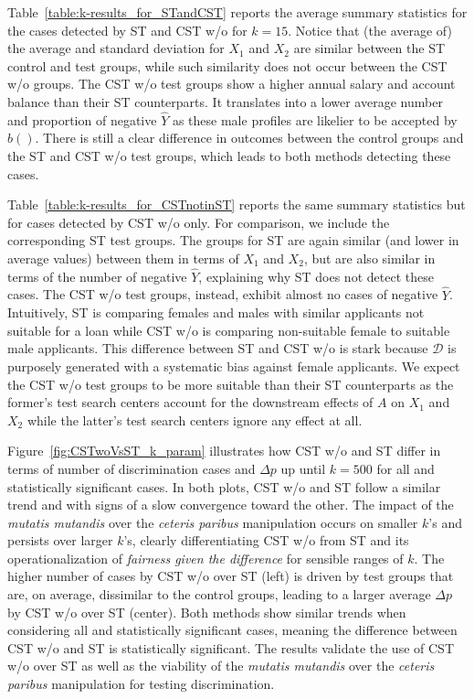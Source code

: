 Table~\ref{table:k-results_for_STandCST} reports the average summary statistics for the cases detected by ST and CST w/o for $k=15$.
Notice that (the average of) the average and standard deviation for $X_1$ and $X_2$ are similar between the ST control and test groups, while such similarity does not occur between the CST w/o groups.
The CST w/o test groups show a higher annual salary and account balance than their ST counterparts. 
It translates into a lower average number and proportion of negative $\hat{Y}$ as these male profiles are likelier to be accepted by $b()$.
There is still a clear difference in outcomes between the control groups and the ST and CST w/o test groups, which leads to both methods detecting these cases.

Table~\ref{table:k-results_for_CSTnotinST} reports the same summary statistics but for cases detected by CST w/o only. 
For comparison, we include the corresponding ST test groups. 
The groups for ST are again similar (and lower in average values) between them in terms of $X_1$ and $X_2$, but are also similar in terms of the number of negative $\hat{Y}$, explaining why ST does not detect these cases. 
The CST w/o test groups, instead, exhibit almost no cases of negative $\hat{Y}$. 
Intuitively, 
ST is comparing females and males with similar applicants not suitable for a loan while CST w/o is comparing non-suitable female to suitable male applicants.
This difference between ST and CST w/o is stark because $\mathcal{D}$ is purposely generated with a systematic bias against female applicants. 
We expect the CST w/o test groups to be more suitable than their ST counterparts as the former's test search centers account for the downstream effects of $A$ on $X_1$ and $X_2$ while the latter's test search centers ignore any effect at all.

Figure~\ref{fig:CSTwoVsST_k_param} illustrates how CST w/o and ST differ in terms of number of discrimination cases and $\Delta p$ up until $k=500$ for all and statistically significant cases.
In both plots, CST w/o and ST follow a similar trend and with signs of a slow convergence toward the other.
The impact of the \textit{mutatis mutandis} over the \textit{ceteris paribus} manipulation occurs on smaller $k$'s and persists over larger $k$'s, clearly differentiating CST w/o from ST and its operationalization of \textit{fairness given the difference} for sensible ranges of $k$.
The higher number of cases by CST w/o over ST (left) is driven by test groups that are, on average, dissimilar to the control groups, leading to a larger average $\Delta p$ by CST w/o over ST (center).
Both methods show similar trends when considering all and statistically significant cases, meaning the difference between CST w/o and ST is statistically significant.
The results validate the use of CST w/o over ST as well as the viability of the \textit{mutatis mutandis} over the \textit{ceteris paribus} manipulation for testing discrimination.

